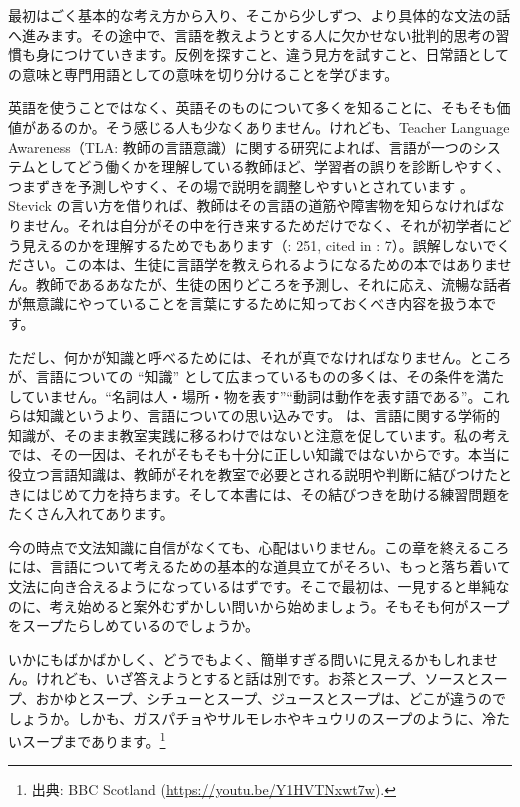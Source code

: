 最初はごく基本的な考え方から入り、そこから少しずつ、より具体的な文法の話へ進みます。その途中で、言語を教えようとする人に欠かせない批判的思考の習慣も身につけていきます。反例を探すこと、違う見方を試すこと、日常語としての意味と専門用語としての意味を切り分けることを学びます。

英語を使うことではなく、英語そのものについて多くを知ることに、そもそも価値があるのか。そう感じる人も少なくありません。けれども、Teacher Language Awareness（TLA: 教師の言語意識）に関する研究によれば、言語が一つのシステムとしてどう働くかを理解している教師ほど、学習者の誤りを診断しやすく、つまずきを予測しやすく、その場で説明を調整しやすいとされています \autocite{Andrews2007}。Stevick の言い方を借りれば、教師はその言語の道筋や障害物を知らなければなりません。それは自分がその中を行き来するためだけでなく、それが初学者にどう見えるのかを理解するためでもあります（\citeyear{Stevick1980}: 251, cited in \citealt{Andrews2007}: 7）。誤解しないでください。この本は、生徒に言語学を教えられるようになるための本ではありません。教師であるあなたが、生徒の困りどころを予測し、それに応え、流暢な話者が無意識にやっていることを言葉にするために知っておくべき内容を扱う本です。

ただし、何かが知識と呼べるためには、それが真でなければなりません。ところが、言語についての \enquote{知識} として広まっているものの多くは、その条件を満たしていません。\enquote{名詞は人・場所・物を表す}\enquote{動詞は動作を表す語である}。これらは知識というより、言語についての思い込みです。\textcite{Bartels2009} は、言語に関する学術的知識が、そのまま教室実践に移るわけではないと注意を促しています。私の考えでは、その一因は、それがそもそも十分に正しい知識ではないからです。本当に役立つ言語知識は、教師がそれを教室で必要とされる説明や判断に結びつけたときにはじめて力を持ちます。そして本書には、その結びつきを助ける練習問題をたくさん入れてあります。

今の時点で文法知識に自信がなくても、心配はいりません。この章を終えるころには、言語について考えるための基本的な道具立てがそろい、もっと落ち着いて文法に向き合えるようになっているはずです。そこで最初は、一見すると単純なのに、考え始めると案外むずかしい問いから始めましょう。そもそも何がスープをスープたらしめているのでしょうか。

いかにもばかばかしく、どうでもよく、簡単すぎる問いに見えるかもしれません。けれども、いざ答えようとすると話は別です。お茶とスープ、ソースとスープ、おかゆとスープ、シチューとスープ、ジュースとスープは、どこが違うのでしょうか。しかも、ガスパチョやサルモレホやキュウリのスープのように、冷たいスープまであります。\footnote{出典: BBC Scotland (\url{https://youtu.be/Y1HVTNxwt7w}).}

